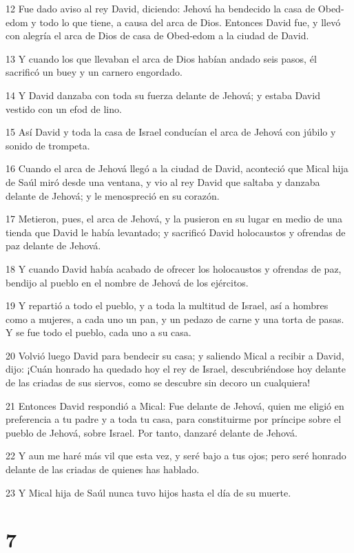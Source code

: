 \par 12 Fue dado aviso al rey David, diciendo: Jehová ha bendecido la casa de Obed-edom y todo lo que tiene, a causa del arca de Dios. Entonces David fue, y llevó con alegría el arca de Dios de casa de Obed-edom a la ciudad de David.
\par 13 Y cuando los que llevaban el arca de Dios habían andado seis pasos, él sacrificó un buey y un carnero engordado.
\par 14 Y David danzaba con toda su fuerza delante de Jehová; y estaba David vestido con un efod de lino.
\par 15 Así David y toda la casa de Israel conducían el arca de Jehová con júbilo y sonido de trompeta.
\par 16 Cuando el arca de Jehová llegó a la ciudad de David, aconteció que Mical hija de Saúl miró desde una ventana, y vio al rey David que saltaba y danzaba delante de Jehová; y le menospreció en su corazón.
\par 17 Metieron, pues, el arca de Jehová, y la pusieron en su lugar en medio de una tienda que David le había levantado; y sacrificó David holocaustos y ofrendas de paz delante de Jehová.
\par 18 Y cuando David había acabado de ofrecer los holocaustos y ofrendas de paz, bendijo al pueblo en el nombre de Jehová de los ejércitos.
\par 19 Y repartió a todo el pueblo, y a toda la multitud de Israel, así a hombres como a mujeres, a cada uno un pan, y un pedazo de carne y una torta de pasas. Y se fue todo el pueblo, cada uno a su casa.
\par 20 Volvió luego David para bendecir su casa; y saliendo Mical a recibir a David, dijo: ¡Cuán honrado ha quedado hoy el rey de Israel, descubriéndose hoy delante de las criadas de sus siervos, como se descubre sin decoro un cualquiera!
\par 21 Entonces David respondió a Mical: Fue delante de Jehová, quien me eligió en preferencia a tu padre y a toda tu casa, para constituirme por príncipe sobre el pueblo de Jehová, sobre Israel. Por tanto, danzaré delante de Jehová.
\par 22 Y aun me haré más vil que esta vez, y seré bajo a tus ojos; pero seré honrado delante de las criadas de quienes has hablado. 
\par 23 Y Mical hija de Saúl nunca tuvo hijos hasta el día de su muerte.

\chapter{7}

